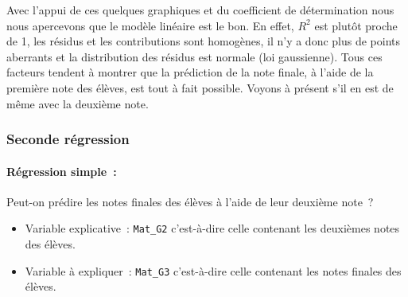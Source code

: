 \documentclass[11pt]{article}
\begin{document}
\FloatBarrier
Avec l'appui de ces quelques graphiques et du coefficient de détermination nous nous apercevons que le modèle linéaire est le bon. En effet, $R^2$ est plutôt proche de 1, les résidus et les contributions sont homogènes, il n'y a donc plus de points aberrants et la distribution des résidus est normale (loi gaussienne). Tous ces facteurs tendent à montrer que la prédiction de la note finale, à l'aide de la première note des élèves, est tout à fait possible. Voyons à présent s'il en est de même avec la deuxième note.
\FloatBarrier

\subsubsection{Seconde régression}
\paragraph{Régression simple :  } Peut-on prédire les notes finales des élèves à l'aide de leur deuxième note ?~\\
\begin{itemize}
\item Variable explicative : \texttt{Mat\_G2} c'est-à-dire celle contenant les deuxièmes notes des élèves.
\item Variable à expliquer : \texttt{Mat\_G3} c'est-à-dire celle contenant les notes finales des élèves.
\end{itemize}
\end{document}
